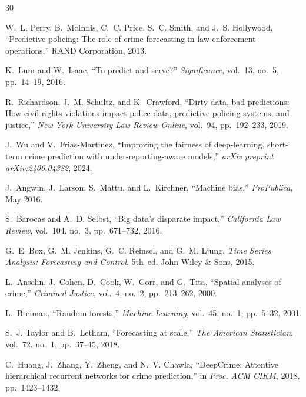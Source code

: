 \documentclass{svproc}
\begin{document}
\begin{thebibliography}{30}

W.~L. Perry, B.~McInnis, C.~C. Price, S.~C. Smith, and J.~S. Hollywood, ``Predictive policing: The role of crime forecasting in law enforcement operations,'' RAND Corporation, 2013.

K.~Lum and W.~Isaac, ``To predict and serve?'' \textit{Significance}, vol.~13, no.~5, pp.~14--19, 2016.

R.~Richardson, J.~M. Schultz, and K.~Crawford, ``Dirty data, bad predictions: How civil rights violations impact police data, predictive policing systems, and justice,'' \textit{New York University Law Review Online}, vol.~94, pp.~192--233, 2019.

J.~Wu and V.~Frias-Martinez, ``Improving the fairness of deep-learning, short-term crime prediction with under-reporting-aware models,'' \textit{arXiv preprint arXiv:2406.04382}, 2024.

J.~Angwin, J.~Larson, S.~Mattu, and L.~Kirchner, ``Machine bias,'' \textit{ProPublica}, May 2016.

S.~Barocas and A.~D. Selbst, ``Big data's disparate impact,'' \textit{California Law Review}, vol.~104, no.~3, pp.~671--732, 2016.

G.~E. Box, G.~M. Jenkins, G.~C. Reinsel, and G.~M. Ljung, \textit{Time Series Analysis: Forecasting and Control}, 5th~ed. John Wiley \& Sons, 2015.

L.~Anselin, J.~Cohen, D.~Cook, W.~Gorr, and G.~Tita, ``Spatial analyses of crime,'' \textit{Criminal Justice}, vol.~4, no.~2, pp.~213--262, 2000.

L.~Breiman, ``Random forests,'' \textit{Machine Learning}, vol.~45, no.~1, pp.~5--32, 2001.

S.~J. Taylor and B.~Letham, ``Forecasting at scale,'' \textit{The American Statistician}, vol.~72, no.~1, pp.~37--45, 2018.

C.~Huang, J.~Zhang, Y.~Zheng, and N.~V. Chawla, ``DeepCrime: Attentive hierarchical recurrent networks for crime prediction,'' in \textit{Proc. ACM CIKM}, 2018, pp.~1423--1432.


\end{thebibliography}
\end{document}
